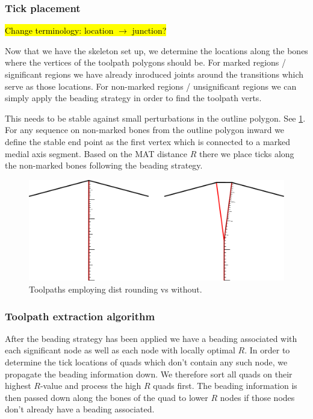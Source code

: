 \subsubsection{Tick placement}
\hl{Change terminology: location $\to$ junction?}

Now that we have the skeleton set up, we determine the locations along the bones where the vertices of the toolpath polygons should be.
For marked regions / significant regions we have already inroduced joints around the transitions which serve as those locations.
For non-marked regions / unsignificant regions we can simply apply the beading strategy in order to find the toolpath verts.


This needs to be stable against small perturbations in the outline polygon.
See \cref{heterogeneous_joint_generation}.
For any sequence on non-marked bones from the outline polygon inward we define the stable end point as the first vertex which is connected to a marked medial axis segment.
Based on the MAT distance $R$ there we place ticks along the non-marked bones following the beading strategy.

\begin{figure}
\includegraphics[width=\columnwidth]{sources/method/heterogeneous_joint_generation.pdf}
\caption{Toolpaths employing dist rounding vs without.}
\label{heterogeneous_joint_generation}
\end{figure}





\subsubsection{Toolpath extraction algorithm}
After the beading strategy has been applied we have a beading associated with each significant node as well as each node with locally optimal $R$.
In order to determine the tick locations of quads which don't contain any such node, we propagate the beading information down.
We therefore sort all quads on their highest $R$-value and process the high $R$ quads first.
The beading information is then passed down along the bones of the quad to lower $R$ nodes if those nodes don't already have a beading associated.

